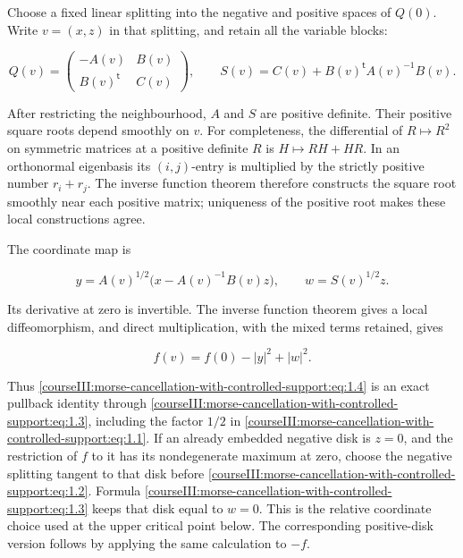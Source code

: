 Choose a fixed linear splitting into the negative and positive spaces of \(Q(0)\). Write \(v=(x,z)\) in that splitting, and retain all the variable blocks:

\begin{equation}
Q(v)=
\begin{pmatrix}-A(v)&B(v)\\ B(v)^{\mathsf t}&C(v)\end{pmatrix},
\qquad S(v)=C(v)+B(v)^{\mathsf t}A(v)^{-1}B(v).
\label{courseIII:morse-cancellation-with-controlled-support:eq:1.2}
\end{equation}

After restricting the neighbourhood, \(A\) and \(S\) are positive definite. Their positive square roots depend smoothly on \(v\). For completeness, the differential of \(R\mapsto R^2\) on symmetric matrices at a positive definite \(R\) is \(H\mapsto RH+HR\). In an orthonormal eigenbasis its \((i,j)\)-entry is multiplied by the strictly positive number \(r_i+r_j\). The inverse function theorem therefore constructs the square root smoothly near each positive matrix; uniqueness of the positive root makes these local constructions agree.

The coordinate map is

\begin{equation}
y=A(v)^{1/2}\bigl(x-A(v)^{-1}B(v)z\bigr),
\qquad w=S(v)^{1/2}z.
\label{courseIII:morse-cancellation-with-controlled-support:eq:1.3}
\end{equation}

Its derivative at zero is invertible. The inverse function theorem gives a local diffeomorphism, and direct multiplication, with the mixed terms retained, gives

\begin{equation}
f(v)=f(0)-|y|^2+|w|^2.
\label{courseIII:morse-cancellation-with-controlled-support:eq:1.4}
\end{equation}

Thus \eqref{courseIII:morse-cancellation-with-controlled-support:eq:1.4} is an exact pullback identity through \eqref{courseIII:morse-cancellation-with-controlled-support:eq:1.3}, including the factor \(1/2\) in \eqref{courseIII:morse-cancellation-with-controlled-support:eq:1.1}. If an already embedded negative disk is \(z=0\), and the restriction of \(f\) to it has its nondegenerate maximum at zero, choose the negative splitting tangent to that disk before \eqref{courseIII:morse-cancellation-with-controlled-support:eq:1.2}. Formula \eqref{courseIII:morse-cancellation-with-controlled-support:eq:1.3} keeps that disk equal to \(w=0\). This is the relative coordinate choice used at the upper critical point below. The corresponding positive-disk version follows by applying the same calculation to \(-f\).

